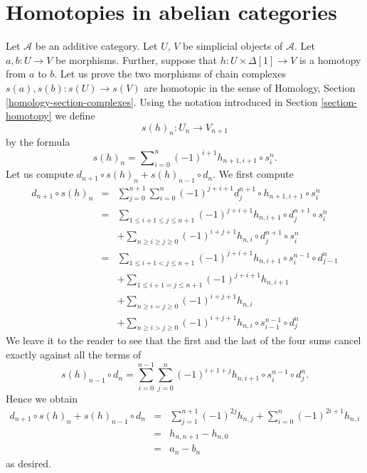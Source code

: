 \section{Homotopies in abelian categories}
\label{section-homotopy-abelian}

\noindent
Let $\mathcal{A}$ be an additive category. Let $U$, $V$ be simplicial objects
of $\mathcal{A}$. Let $a, b : U \to V$ be morphisms. Further, suppose that
$h : U \times \Delta[1] \to V$ is a homotopy from $a$ to $b$. Let us prove
the two morphisms of chain complexes $s(a), s(b) : s(U) \longrightarrow s(V)$
are homotopic in the sense of
Homology, Section \ref{homology-section-complexes}.
Using the notation introduced in Section \ref{section-homotopy}
we define
$$
s(h)_n : U_n \longrightarrow V_{n + 1}
$$
by the formula
\begin{equation}
\label{equation-homotopy-to-homotopy}
s(h)_n = \sum\nolimits_{i = 0}^n (-1)^{i + 1} h_{n + 1, i + 1} \circ s^n_i.
\end{equation}
Let us compute $d_{n + 1} \circ s(h)_n + s(h)_{n - 1} \circ d_n$.
We first compute
\begin{eqnarray*}
d_{n + 1} \circ s(h)_n & = &
\sum\nolimits_{j = 0}^{n + 1}
\sum\nolimits_{i = 0}^n
(-1)^{j + i + 1}
d^{n + 1}_j \circ h_{n + 1, i + 1} \circ s^n_i \\
& = &
\sum\nolimits_{1 \leq i + 1 \leq j \leq n + 1}
(-1)^{j + i + 1}
h_{n, i + 1} \circ d^{n + 1}_j \circ s^n_i \\
& &
+
\sum\nolimits_{n \geq i \geq j \geq 0}
(-1)^{i + j + 1}
h_{n, i} \circ d^{n + 1}_j \circ s^n_i \\
& = &
\sum\nolimits_{1 \leq i + 1 < j \leq n + 1}
(-1)^{j + i + 1}
h_{n, i + 1} \circ s^{n - 1}_i \circ d^n_{j - 1} \\
& &
+
\sum\nolimits_{1 \leq i + 1 = j \leq n + 1}
(-1)^{j + i + 1}
h_{n, i + 1} \\
& &
+
\sum\nolimits_{n \geq i = j \geq 0}
(-1)^{i + j + 1}
h_{n, i} \\
& &
+
\sum\nolimits_{n \geq i > j \geq 0}
(-1)^{i + j + 1}
h_{n, i} \circ s^{n - 1}_{i - 1} \circ d^n_j
\end{eqnarray*}
We leave it to the reader to see that the first and the last
of the four sums cancel exactly against all the terms of
$$
s(h)_{n - 1} \circ d_n
=
\sum_{i = 0}^{n - 1} \sum_{j = 0}^n
(-1)^{i + 1 + j} h_{n, i + 1} \circ s^{n - 1}_i \circ d^n_j.
$$
Hence we obtain
\begin{eqnarray*}
d_{n + 1} \circ s(h)_n + s(h)_{n - 1} \circ d_n
& = &
\sum_{j = 1}^{n + 1} (-1)^{2j} h_{n, j}
+
\sum_{i = 0}^n (-1)^{2i + 1} h_{n, i} \\
& = &
h_{n, n + 1} - h_{n , 0} \\
& = &
a_n - b_n
\end{eqnarray*}
as desired.

